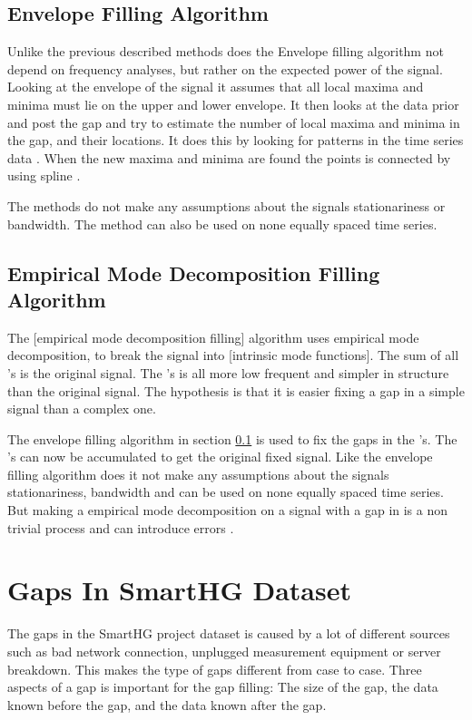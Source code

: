 \subsection{Envelope Filling Algorithm}
\label{T:EGA}
Unlike the previous described methods does the Envelope filling algorithm not depend on frequency analyses, but rather on the expected power of the signal. Looking at the envelope of the signal it assumes that all local maxima and minima must lie on the  upper and lower envelope. It then looks at the data prior and post the gap and try to estimate the number of local maxima and minima in the gap, and their locations. It does this by looking for patterns in the time series data \citep{RefWorks:6}. When the new maxima and minima are found the points is connected by using spline \cite{RefWorks:16}. 

The methods do not make any assumptions about the signals stationariness or bandwidth. The method can also be used on none equally spaced time series. 

\subsection{Empirical Mode Decomposition Filling Algorithm}
The [empirical mode decomposition filling] algorithm uses empirical mode decomposition, to break the signal into [intrinsic mode functions]. The sum of all 's is the original signal. The 's is all more low frequent and simpler in structure than the original signal. The hypothesis is that it is easier fixing a gap in a simple signal than a complex one. 

The envelope filling algorithm in section \ref{T:EGA} is used to fix the gaps in the 's. The 's can now be accumulated to get the original fixed signal. Like the envelope filling algorithm does it not make any assumptions about the signals stationariness, bandwidth and can be used on none equally spaced time series. But making a empirical mode decomposition on a signal with a gap in is a non trivial process and can introduce errors \citep{RefWorks:16}. 



\section{Gaps In SmartHG Dataset}
The gaps in the SmartHG project dataset is caused by a lot of different sources such as bad network connection, unplugged measurement equipment or server breakdown. This makes the type of gaps different from case to case. Three aspects of a gap is important for the gap filling: The size of the gap, the data known before the gap, and the data known after the gap. 

